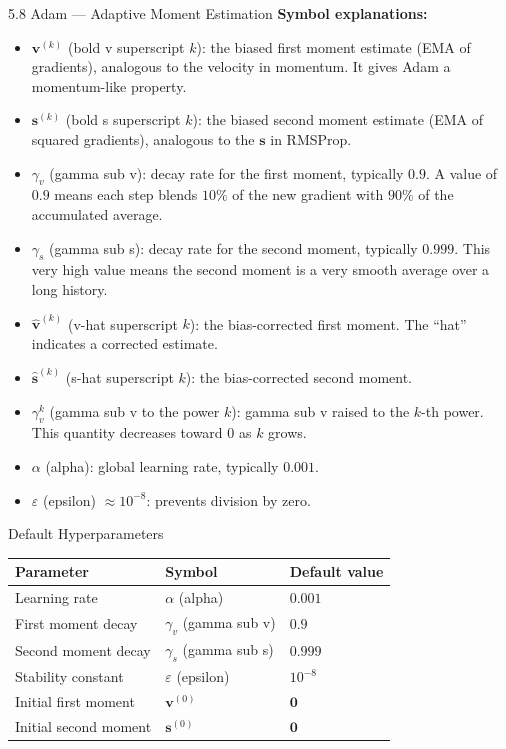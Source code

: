 \documentclass[aspectratio=169,10pt]{beamer}
\newcommand{\vv}{\mathbf{v}}
\newcommand{\vs}{\mathbf{s}}
\begin{document}
\begin{frame}[allowframebreaks]{5.8 Adam --- Adaptive Moment Estimation}
  \textbf{Symbol explanations:}
  \begin{itemize}
    \item $\vv^{(k)}$ (bold v superscript $k$): the biased
          first moment estimate (EMA of gradients), analogous
          to the velocity in momentum.  It gives Adam a
          momentum-like property.
    \item $\vs^{(k)}$ (bold s superscript $k$): the biased
          second moment estimate (EMA of squared gradients),
          analogous to the $\vs$ in RMSProp.
    \item $\gamma_v$ (gamma sub v): decay rate for the first
          moment, typically $0.9$.  A value of $0.9$ means
          each step blends $10\%$ of the new gradient with
          $90\%$ of the accumulated average.
    \item $\gamma_s$ (gamma sub s): decay rate for the second
          moment, typically $0.999$.  This very high value
          means the second moment is a very smooth average
          over a long history.
    \item $\hat{\vv}^{(k)}$ (v-hat superscript $k$): the
          bias-corrected first moment.  The ``hat'' indicates
          a corrected estimate.
    \item $\hat{\vs}^{(k)}$ (s-hat superscript $k$): the
          bias-corrected second moment.
    \item $\gamma_v^k$ (gamma sub v to the power $k$):
          gamma sub v raised to the $k$-th power.
          This quantity decreases toward $0$ as $k$ grows.
    \item $\alpha$ (alpha): global learning rate, typically
          $0.001$.
    \item $\varepsilon$ (epsilon) $\approx 10^{-8}$:
          prevents division by zero.
  \end{itemize}

  \begin{block}{Default Hyperparameters}
    \footnotesize
    \begin{tabular}{lll}
      \toprule
      Parameter & Symbol & Default value\\
      \midrule
      Learning rate & $\alpha$ (alpha) & $0.001$\\
      First moment decay & $\gamma_v$ (gamma sub v) & $0.9$\\
      Second moment decay & $\gamma_s$ (gamma sub s) & $0.999$\\
      Stability constant & $\varepsilon$ (epsilon) & $10^{-8}$\\
      Initial first moment & $\vv^{(0)}$ & $\mathbf{0}$\\
      Initial second moment & $\vs^{(0)}$ & $\mathbf{0}$\\
      \bottomrule
    \end{tabular}
  \end{block}


\end{frame}
\end{document}
